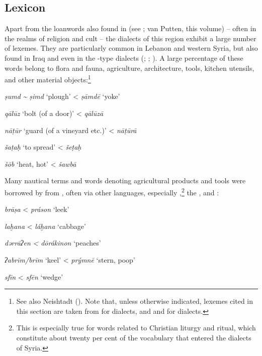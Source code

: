 \documentclass[output=paper]{langsci/langscibook}
\begin{document}
  \subsection{Lexicon} 
Apart from the  {loanwords} also found in  (see \citealt{Retsö2011}; van Putten, this volume) – often in the realms of religion and cult – the dialects of this region exhibit a large number of  lexemes. They are particularly common in Lebanon and western Syria, but also found in Iraq and even in the -type dialects (\citealt{Féghali1918}; \citealt{Borg2004}; \citeyear{Borg2008}). A large percentage of these words belong to flora and fauna, agriculture, architecture, tools, kitchen utensils, and other material objects:\footnote{See also Neishtadt (\citeyear[282]{Neishtadt2015}). Note that, unless otherwise indicated, lexemes cited in this section are taken from \citet{Barthélemy1935} for  dialects, and \citet{WoodheadEtAl1967} and \citet{alBakri1972} for  dialects.}

\ea
\textit{ṣumd} \textit{{\textasciitilde} ṣimd} ‘plough’ <  \textit{ṣāmdē} ‘yoke’

\textit{qālūz} ‘bolt (of a door)’ <  \textit{qālūzā}

\textit{nāṭūr} ‘guard (of a vineyard etc.)’ <  \textit{nāṭūrā}

\textit{šaṭaḥ} ‘to spread’ <  \textit{šeṭaḥ}

\textit{šōb} ‘heat, hot’ <  \textit{šawbā}
\z

Many nautical terms and words denoting agricultural products and tools were borrowed by  from , often via other languages, especially ,\footnote{This is especially true for words related to Christian liturgy and ritual, which constitute about twenty per cent of the  vocabulary that entered the dialects of Syria.} the , and : 

\ea
\textit{brāṣa} <  \textit{práson} ‘leek’ 

\textit{laḫana} <  \textit{láḫana} ‘cabbage’

\textit{dərrāʔen} \textit{<}  \textit{dōrákinon} ‘peaches’

\textit{ʔabrīm/brīm} ‘keel’ <  \textit{prýmnē} ‘stern, poop’

\textit{sfīn} <  \textit{sfēn} ‘wedge’
\z
\end{document}
